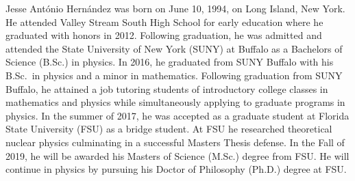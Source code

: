 \documentclass[12pt,expanded,copyright]{fsuthesis}
\begin{document}
\mainmatter






%




\renewcommand*{\bibname}{References}



\begin{biosketch}
Jesse Ant\'{o}nio Hern\'{a}ndez was born on June 10, 1994, on Long Island, New York. He attended Valley Stream South High School for early education where he graduated with honors in 2012. Following graduation, he was admitted and attended the State University of New York (SUNY) at Buffalo as a Bachelors of Science (B.Sc.) in physics. In 2016, he graduated from SUNY Buffalo with his B.Sc.\ in physics and a minor in mathematics. Following graduation from SUNY Buffalo, he attained a job tutoring students of introductory college classes in mathematics and physics while simultaneously applying to graduate programs in physics. In the summer of 2017, he was accepted as a graduate student at Florida State University (FSU) as a bridge student. At FSU he researched theoretical nuclear physics culminating in a successful Masters Thesis defense. In the Fall of 2019, he will be awarded his Masters of Science (M.Sc.) degree from FSU. He will continue in physics by pursuing his Doctor of Philosophy (Ph.D.) degree at FSU.  
\end{biosketch}
\end{document}
